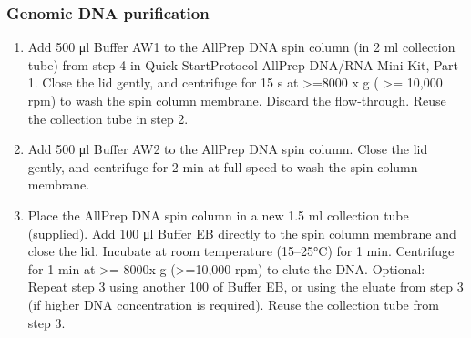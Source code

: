 \subsubsection{Genomic DNA purification}
\begin{enumerate}
\item Add 500 μl Buffer AW1 to the AllPrep DNA spin column (in 2 ml collection tube) from step 4 in Quick-StartProtocol AllPrep DNA/RNA Mini Kit, Part 1. Close the lid gently, and centrifuge for 15 s at >=8000 x g ( >= 10,000 rpm) to wash the spin column membrane. Discard the flow-through. Reuse the collection tube in step 2.
\item  Add 500 μl Buffer AW2 to the AllPrep DNA spin column. Close the lid gently, and centrifuge for 2 min at full speed to wash the spin column membrane.
\item  Place the AllPrep DNA spin column in a new 1.5 ml collection tube (supplied). Add 100 μl Buffer EB directly to the spin column membrane and close the lid. Incubate at room temperature (15–25°C) for 1 min. Centrifuge for 1 min at >= 8000x g (>=10,000 rpm) to elute the DNA.
Optional: Repeat step 3 using another 100 \uL of Buffer EB, or using the eluate from step 3 (if higher DNA concentration is required). Reuse the collection tube from step 3.
\end{enumerate}

